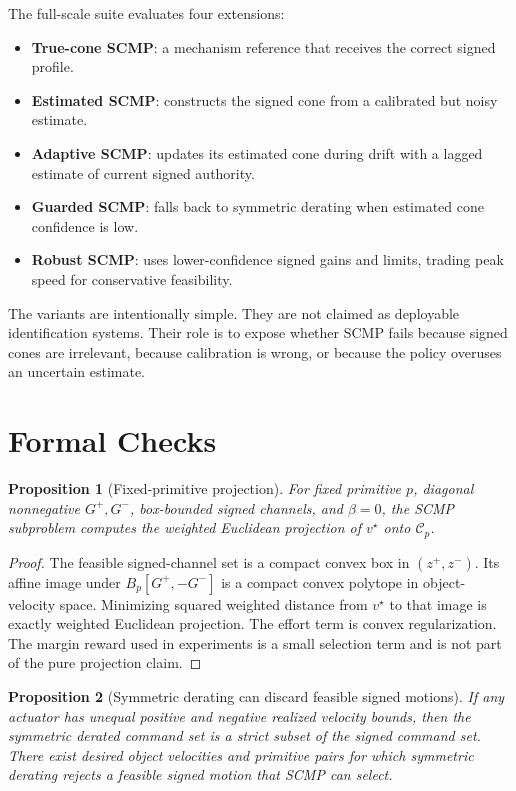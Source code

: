 \documentclass{article}
\newtheorem{proposition}{Proposition}
\begin{document}
The full-scale suite evaluates four extensions:
\begin{itemize}
\item \textbf{True-cone SCMP}: a mechanism reference that receives the correct signed profile.
\item \textbf{Estimated SCMP}: constructs the signed cone from a calibrated but noisy estimate.
\item \textbf{Adaptive SCMP}: updates its estimated cone during drift with a lagged estimate of current signed authority.
\item \textbf{Guarded SCMP}: falls back to symmetric derating when estimated cone confidence is low.
\item \textbf{Robust SCMP}: uses lower-confidence signed gains and limits, trading peak speed for conservative feasibility.
\end{itemize}
The variants are intentionally simple. They are not claimed as deployable identification systems. Their role is to expose whether SCMP fails because signed cones are irrelevant, because calibration is wrong, or because the policy overuses an uncertain estimate.

\section{Formal Checks}

\begin{proposition}[Fixed-primitive projection]
For fixed primitive $p$, diagonal nonnegative $G^+,G^-$, box-bounded signed channels, and $\beta=0$, the SCMP subproblem computes the weighted Euclidean projection of $v^\star$ onto $\mathcal{C}_p$.
\end{proposition}

\begin{proof}
The feasible signed-channel set is a compact convex box in $(z^+,z^-)$. Its affine image under $B_p[G^+,-G^-]$ is a compact convex polytope in object-velocity space. Minimizing squared weighted distance from $v^\star$ to that image is exactly weighted Euclidean projection. The effort term is convex regularization. The margin reward used in experiments is a small selection term and is not part of the pure projection claim.
\end{proof}

\begin{proposition}[Symmetric derating can discard feasible signed motions]
If any actuator has unequal positive and negative realized velocity bounds, then the symmetric derated command set is a strict subset of the signed command set. There exist desired object velocities and primitive pairs for which symmetric derating rejects a feasible signed motion that SCMP can select.
\end{proposition}
\end{document}
